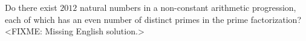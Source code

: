 \problem{}
Do there exist $2012$ natural numbers in a non-constant arithmetic progression, each of
which has an even number of distinct primes in the prime factorization?
\solution
<FIXME: Missing English solution.>
\endproblem
